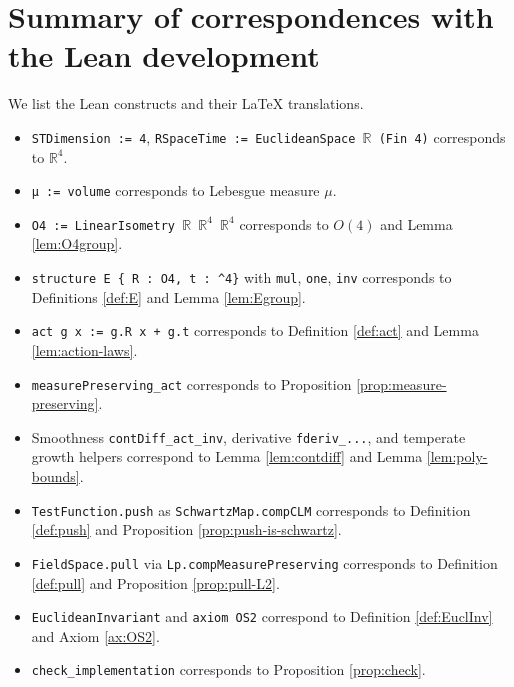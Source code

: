\documentclass{article}
\newcommand{\R}{\mathbb{R}}
\newcommand{\Rd}{\mathbb{R}^4}
\newcommand{\1}{\mathbbm{1}}
\theoremstyle{plain}
\theoremstyle{definition}
\numberwithin{equation}{section}
\begin{document}
\section{Summary of correspondences with the Lean development}

We list the Lean constructs and their LaTeX translations.

\begin{itemize}
\item \texttt{STDimension := 4}, \texttt{RSpaceTime := EuclideanSpace $\R$ (Fin 4)} corresponds to $\Rd$.
\item \texttt{μ := volume} corresponds to Lebesgue measure $\mu$.
\item \texttt{O4 := LinearIsometry $\R$ $\Rd$ $\Rd$} corresponds to $O(4)$ and Lemma \ref{lem:O4group}.
\item \texttt{structure E \{ R : O4, t : \Rd\}} with \texttt{mul}, \texttt{one}, \texttt{inv} corresponds to Definitions \ref{def:E} and Lemma \ref{lem:Egroup}.
\item \texttt{act g x := g.R x + g.t} corresponds to Definition \ref{def:act} and Lemma \ref{lem:action-laws}.
\item \texttt{measurePreserving\_act} corresponds to Proposition \ref{prop:measure-preserving}.
\item Smoothness \texttt{contDiff\_act\_inv}, derivative \texttt{fderiv\_...}, and temperate growth helpers correspond to Lemma \ref{lem:contdiff} and Lemma \ref{lem:poly-bounds}.
\item \texttt{TestFunction.push} as \texttt{SchwartzMap.compCLM} corresponds to Definition \ref{def:push} and Proposition \ref{prop:push-is-schwartz}.
\item \texttt{FieldSpace.pull} via \texttt{Lp.compMeasurePreserving} corresponds to Definition \ref{def:pull} and Proposition \ref{prop:pull-L2}.
\item \texttt{EuclideanInvariant} and \texttt{axiom OS2} correspond to Definition \ref{def:EuclInv} and Axiom \ref{ax:OS2}.
\item \texttt{check\_implementation} corresponds to Proposition \ref{prop:check}.
\end{itemize}




\end{document}
